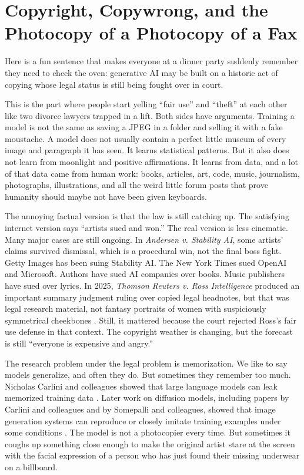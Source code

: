 \documentclass[12pt,oneside]{book}
\begin{document}
\chapter{Copyright, Copywrong, and the Photocopy of a Photocopy of a Fax}

Here is a fun sentence that makes everyone at a dinner party suddenly remember they need to check the oven: generative AI may be built on a historic act of copying whose legal status is still being fought over in court.

This is the part where people start yelling ``fair use'' and ``theft'' at each other like two divorce lawyers trapped in a lift. Both sides have arguments. Training a model is not the same as saving a JPEG in a folder and selling it with a fake moustache. A model does not usually contain a perfect little museum of every image and paragraph it has seen. It learns statistical patterns. But it also does not learn from moonlight and positive affirmations. It learns from data, and a lot of that data came from human work: books, articles, art, code, music, journalism, photographs, illustrations, and all the weird little forum posts that prove humanity should maybe not have been given keyboards.

The annoying factual version is that the law is still catching up. The satisfying internet version says ``artists sued and won.'' The real version is less cinematic. Many major cases are still ongoing. In \emph{Andersen v. Stability AI}, some artists' claims survived dismissal, which is a procedural win, not the final boss fight. Getty Images has been suing Stability AI. The New York Times sued OpenAI and Microsoft. Authors have sued AI companies over books. Music publishers have sued over lyrics. In 2025, \emph{Thomson Reuters v. Ross Intelligence} produced an important summary judgment ruling over copied legal headnotes, but that was legal research material, not fantasy portraits of women with suspiciously symmetrical cheekbones \parencite{andersen2023,getty2023,nyt2023,thomsonreuters2025}. Still, it mattered because the court rejected Ross's fair use defense in that context. The copyright weather is changing, but the forecast is still ``everyone is expensive and angry.''

The research problem under the legal problem is memorization. We like to say models generalize, and often they do. But sometimes they remember too much. Nicholas Carlini and colleagues showed that large language models can leak memorized training data \parencite{carlini2021}. Later work on diffusion models, including papers by Carlini and colleagues and by Somepalli and colleagues, showed that image generation systems can reproduce or closely imitate training examples under some conditions \parencite{carlini2023,somepalli2023}. The model is not a photocopier every time. But sometimes it coughs up something close enough to make the original artist stare at the screen with the facial expression of a person who has just found their missing underwear on a billboard.
\end{document}
